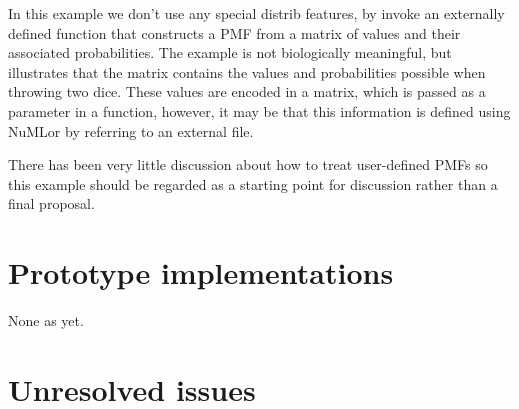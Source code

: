 \documentclass[draftspec]{sbmlpkgspec}
\newcommand{\numl}{NuML\xspace}
\newcommand{\controversial}{\marginpar{\hspace*{34pt}\raisebox{-0.5ex}{\Large?}}}
\begin{document}
In this example we don't use any special distrib features, by invoke
an externally defined function that constructs a PMF from a matrix of
values and their associated probabilities. The example is not
biologically meaningful, but illustrates that the matrix contains the
values and probabilities possible when throwing two dice. These values
are encoded in a matrix, which is passed as a parameter in a function,
however, it may be that this information is defined using
\numl\controversial or by referring to an external file.

There has been very little discussion\controversial{} about how to treat user-defined
PMFs so this example should be regarded as a starting point for
discussion rather than a final proposal.


\section{Prototype implementations}

None as yet.

\section{Unresolved issues}
\label{sec:unresolved}
\end{document}
